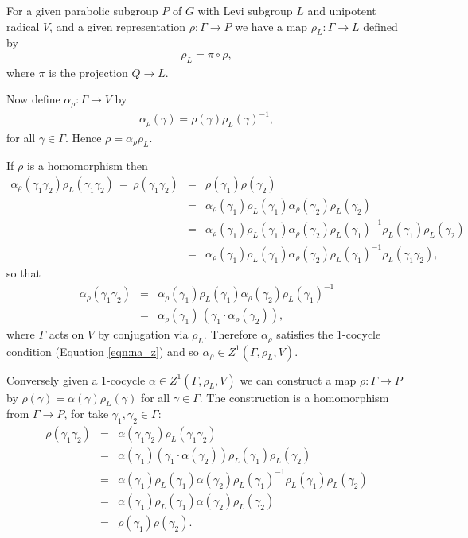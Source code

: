 For a given parabolic subgroup $P$ of $G$ with Levi subgroup $L$ and unipotent radical $V$, and a given representation $\rho:\Gamma\rightarrow P$ we have a map $\rho_L:\Gamma\rightarrow L$ defined by
\begin{eqnarray}
  \rho_L = \pi \circ \rho,
  \label{eqn:proj_l}
\end{eqnarray}
where $\pi$ is the projection $Q \rightarrow L$.

Now define $\alpha_\rho:\Gamma\rightarrow V$ by 
\begin{eqnarray*}
  \alpha_\rho(\gamma) = \rho(\gamma)\rho_L(\gamma)^{-1},
\end{eqnarray*}
for all $\gamma\in\Gamma$. Hence $\rho = \alpha_\rho\rho_L$.

If $\rho$ is a homomorphism then
\begin{eqnarray*}
	\alpha_\rho(\gamma_1\gamma_2)\rho_L(\gamma_1\gamma_2) \,=\, \rho(\gamma_1\gamma_2) 
		&=& \rho(\gamma_1)\rho(\gamma_2) \\
		&=& \alpha_\rho(\gamma_1)\rho_L(\gamma_1)\alpha_\rho(\gamma_2)\rho_L(\gamma_2) \\
		&=& \alpha_\rho(\gamma_1)\rho_L(\gamma_1)\alpha_\rho(\gamma_2)\rho_L(\gamma_1)^{-1}\rho_L(\gamma_1)\rho_L(\gamma_2)\\
		&=&\alpha_\rho(\gamma_1)\rho_L(\gamma_1)\alpha_\rho(\gamma_2)\rho_L(\gamma_1)^{-1}\rho_L(\gamma_1\gamma_2),
\end{eqnarray*}
so that
\begin{eqnarray*}
	\alpha_\rho(\gamma_1\gamma_2) &=&
	\alpha_\rho(\gamma_1)\rho_L(\gamma_1)\alpha_\rho(\gamma_2)\rho_L(\gamma_1)^{-1}\\
	&=& \alpha_\rho(\gamma_1)\,\left(\gamma_1\cdot\alpha_\rho(\gamma_2)\right),
\end{eqnarray*}
where $\Gamma$ acts on $V$ by conjugation via $\rho_L$. Therefore $\alpha_\rho$ satisfies the 1-cocycle condition (Equation \ref{eqn:na_z}) and so $\alpha_\rho\in Z^1(\Gamma, \rho_L, V)$. 

Conversely given a 1-cocycle $\alpha\in Z^1(\Gamma, \rho_L, V)$ we can construct a map $\rho:\Gamma\rightarrow P$ by $\rho(\gamma) = \alpha(\gamma)\rho_L(\gamma)$ for all $\gamma\in \Gamma$. The construction is a homomorphism from $\Gamma \rightarrow P$, for take $\gamma_1, \gamma_2 \in \Gamma$:
\begin{eqnarray*}
  \rho(\gamma_1 \gamma_2) &=& \alpha(\gamma_1 \gamma_2) \rho_L(\gamma_1 \gamma_2) \\
  &=& \alpha(\gamma_1)(\gamma_1 \cdot \alpha(\gamma_2)) \rho_L(\gamma_1) \rho_L(\gamma_2) \\
  &=& \alpha(\gamma_1) \rho_L(\gamma_1) \alpha(\gamma_2) \rho_L(\gamma_1)^{-1} \rho_L(\gamma_1) \rho_L(\gamma_2) \\
  &=& \alpha(\gamma_1) \rho_L(\gamma_1) \alpha(\gamma_2) \rho_L(\gamma_2) \\
  &=& \rho(\gamma_1) \rho(\gamma_2).
\end{eqnarray*}

